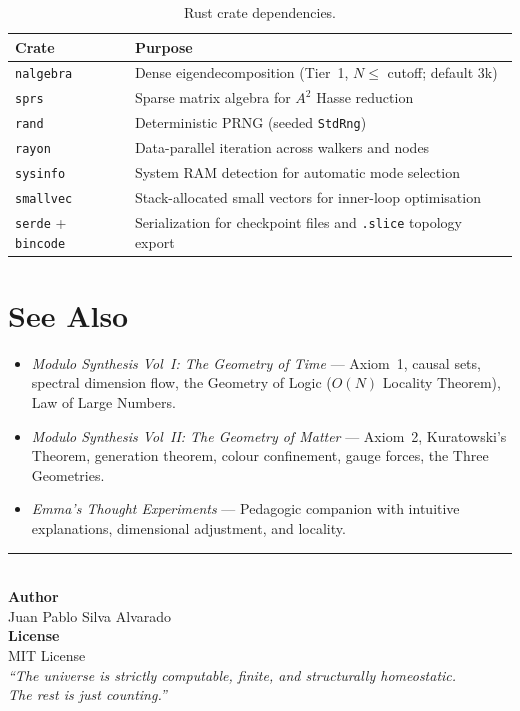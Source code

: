 \documentclass[11pt, a4paper, openany]{book}
\newcommand{\code}[1]{\texttt{#1}}
\begin{document}
\begin{table}[H]
\centering
\begin{tabular}{@{} l l @{}}
\toprule
\textbf{Crate} & \textbf{Purpose} \\
\midrule
\code{nalgebra} & Dense eigendecomposition (Tier~1, $N \le$ cutoff; default 3k) \\
\code{sprs}     & Sparse matrix algebra for $A^2$ Hasse reduction \\
\code{rand}     & Deterministic PRNG (seeded \code{StdRng}) \\
\code{rayon}    & Data-parallel iteration across walkers and nodes \\
\code{sysinfo}  & System RAM detection for automatic mode selection \\
\code{smallvec} & Stack-allocated small vectors for inner-loop optimisation \\
\code{serde} + \code{bincode} & Serialization for checkpoint files and \code{.slice} topology export \\
\bottomrule
\end{tabular}
\caption{Rust crate dependencies.}
\end{table}


\chapter*{See Also}

\begin{itemize}
  \item \emph{Modulo Synthesis Vol~I: The Geometry of Time} --- Axiom~1, causal
        sets, spectral dimension flow, the Geometry of Logic ($O(N)$ Locality
        Theorem), Law of Large Numbers.
  \item \emph{Modulo Synthesis Vol~II: The Geometry of Matter} --- Axiom~2,
        Kuratowski's Theorem, generation theorem, colour confinement, gauge
        forces, the Three Geometries.
  \item \emph{Emma's Thought Experiments} --- Pedagogic companion with
        intuitive explanations, dimensional adjustment, and locality.
\end{itemize}

\vfill
\begin{center}
{\color{main}\rule{0.6\textwidth}{1pt}}\\[1em]
{\large\bfseries\color{structure} Author}\\[4pt]
Juan Pablo Silva Alvarado\\[1em]
{\large\bfseries\color{structure} License}\\[4pt]
MIT License\\[1em]
\itshape\color{gray!60}
``The universe is strictly computable, finite, and structurally homeostatic.\\
The rest is just counting.''
\end{center}
\end{document}

